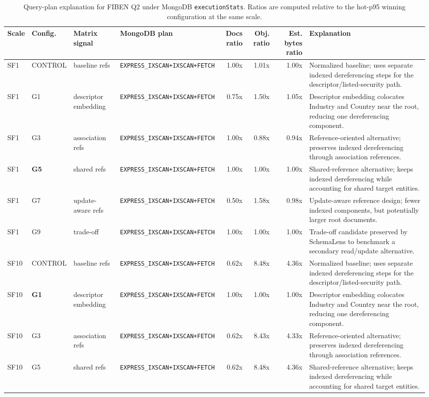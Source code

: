 \begin{table}[t]
\centering
\caption{Query-plan explanation for FIBEN Q2 under MongoDB \texttt{executionStats}. Ratios are computed relative to the hot-p95 winning configuration at the same scale.}
\label{tab:fiben_q2_query_plan_explanation}
\tiny
\setlength{\tabcolsep}{2.0pt}
\renewcommand{\arraystretch}{1.12}
\begin{tabular}{p{}p{}p{}p{}r r r p{}}
\hline
Scale & Config. & Matrix signal & MongoDB plan & Docs ratio & Obj. ratio & Est. bytes ratio & Explanation \tabularnewline
\hline
SF1 & CONTROL & baseline refs & \texttt{EXPRESS\_IXSCAN+IXSCAN+FETCH} & 1.00x & 1.01x & 1.00x & Normalized baseline; uses separate indexed dereferencing steps for the descriptor/listed-security path. \tabularnewline
SF1 & G1 & descriptor embedding & \texttt{EXPRESS\_IXSCAN+IXSCAN+FETCH} & 0.75x & 1.50x & 1.05x & Descriptor embedding colocates Industry and Country near the root, reducing one dereferencing component. \tabularnewline
SF1 & G3 & association refs & \texttt{EXPRESS\_IXSCAN+IXSCAN+FETCH} & 1.00x & 0.88x & 0.94x & Reference-oriented alternative; preserves indexed dereferencing through association references. \tabularnewline
SF1 & \textbf{G5} & shared refs & \texttt{EXPRESS\_IXSCAN+IXSCAN+FETCH} & 1.00x & 1.00x & 1.00x & Shared-reference alternative; keeps indexed dereferencing while accounting for shared target entities. \tabularnewline
SF1 & G7 & update-aware refs & \texttt{EXPRESS\_IXSCAN+IXSCAN+FETCH} & 0.50x & 1.58x & 0.98x & Update-aware reference design; fewer indexed components, but potentially larger root documents. \tabularnewline
SF1 & G9 & trade-off & \texttt{EXPRESS\_IXSCAN+IXSCAN+FETCH} & 1.00x & 1.00x & 1.00x & Trade-off candidate preserved by SchemaLens to benchmark a secondary read/update alternative. \tabularnewline
\hline
SF10 & CONTROL & baseline refs & \texttt{EXPRESS\_IXSCAN+IXSCAN+FETCH} & 0.62x & 8.48x & 4.36x & Normalized baseline; uses separate indexed dereferencing steps for the descriptor/listed-security path. \tabularnewline
SF10 & \textbf{G1} & descriptor embedding & \texttt{EXPRESS\_IXSCAN+IXSCAN+FETCH} & 1.00x & 1.00x & 1.00x & Descriptor embedding colocates Industry and Country near the root, reducing one dereferencing component. \tabularnewline
SF10 & G3 & association refs & \texttt{EXPRESS\_IXSCAN+IXSCAN+FETCH} & 0.62x & 8.43x & 4.33x & Reference-oriented alternative; preserves indexed dereferencing through association references. \tabularnewline
SF10 & G5 & shared refs & \texttt{EXPRESS\_IXSCAN+IXSCAN+FETCH} & 0.62x & 8.48x & 4.36x & Shared-reference alternative; keeps indexed dereferencing while accounting for shared target entities. \tabularnewline

\end{tabular}
\end{table}
